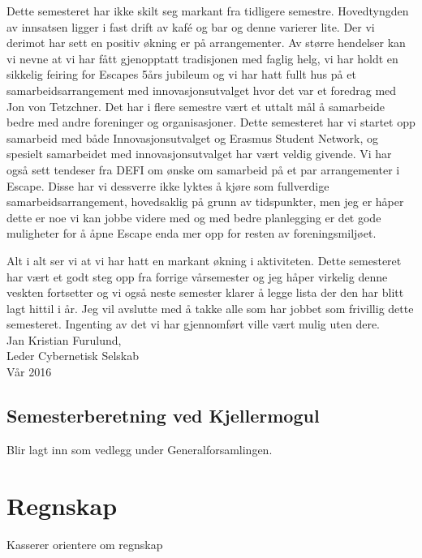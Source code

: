 \documentclass[10pt,norsk,a4paper]{article}
\begin{document}
Dette semesteret har ikke skilt seg markant fra tidligere semestre. Hovedtyngden av innsatsen ligger i fast drift av kafé og bar og denne varierer lite. Der vi derimot har sett en positiv økning er på arrangementer. Av større hendelser kan vi nevne at vi har fått gjenopptatt tradisjonen med faglig helg, vi har holdt en sikkelig feiring for Escapes 5års jubileum og vi har hatt fullt hus på et samarbeidsarrangement med innovasjonsutvalget hvor det var et foredrag med Jon von Tetzchner. Det har i flere semestre vært et uttalt mål å samarbeide bedre med andre foreninger og organisasjoner. Dette semesteret har vi startet opp samarbeid med både Innovasjonsutvalget og Erasmus Student Network, og spesielt samarbeidet med innovasjonsutvalget har vært veldig givende. Vi har også sett tendeser fra DEFI om ønske om samarbeid på et par arrangementer i Escape. Disse har vi dessverre ikke lyktes å kjøre som fullverdige samarbeidsarrangement, hovedsaklig på grunn av tidspunkter, men jeg er håper dette er noe vi kan jobbe videre med og med bedre planlegging er det gode muligheter for å åpne Escape enda mer opp for resten av foreningsmiljøet.

Alt i alt ser vi at vi har hatt en markant økning i aktiviteten. Dette semesteret har vært et godt steg opp fra forrige vårsemester og jeg håper virkelig denne veskten fortsetter og vi også neste semester klarer å legge lista der den har blitt lagt hittil i år. Jeg vil avslutte med å takke alle som har jobbet som frivillig dette semesteret. Ingenting av det vi har gjennomført ville vært mulig uten dere.\\

Jan Kristian Furulund,\\
Leder Cybernetisk Selskab\\
Vår 2016



\subsection{Semesterberetning ved Kjellermogul}

Blir lagt inn som vedlegg under Generalforsamlingen.

\newpage

\section{Regnskap}
Kasserer orientere om regnskap\\

\end{document}
